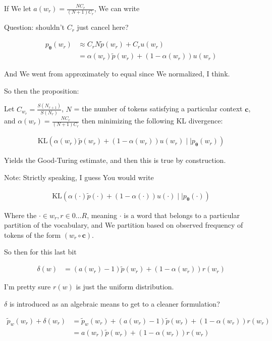 \documentclass{article}
\newcommand{\KL}{\mathrm{KL}}
\newcommand{\vtheta}{\boldsymbol{\theta}}
\newcommand{\model}{p_{\vtheta}}
\newcommand{\context}{\boldsymbol{c}}
\begin{document}
	    If We let $a(w_r) = \frac{NC_r}{(N+1)C_r}$, We can write
	    
	     Question: shouldn't $C_r$ just cancel here?
	    
	    \begin{align}
	    	\model(w_r) &\approx C_r N\tilde{p}(w_r) + C_r u(w_r)\\
	    	&= \alpha(w_r)\tilde{p}(w_r) + (1-\alpha(w_r)) u(w_r)
	    \end{align}
	    
	    And We went from approximately to equal since We normalized, I think.
	    
	    So then the proposition:
	    
	    Let $C_{w_r} = \frac{S(N_{r+1})}{S(N_r)}$, $N$ = the number of tokens satisfying a particular context $\context$, and $\alpha(w_r) = \frac{NC_r}{(N+1)C_r}$ then minimizing the following KL divergence:
	    
	    \begin{align}
	    	\KL(\alpha(w_r)\tilde{p}(w_r) + (1-\alpha(w_r))u(w_r)\mid\mid \model(w_r))
	    \end{align}
	    
	    Yields the Good-Turing estimate, and then this is true by construction.
	    
	    Note: Strictly speaking, I guess You would write
	    
	    \begin{align}
	    	\KL(\alpha(\cdot)\tilde{p}(\cdot) + (1-\alpha(\cdot))u(\cdot)\mid\mid \model(\cdot))
	    \end{align}	
	    
	    Where the $\cdot\in w_r, r\in{0\ldots R}$, meaning $\cdot$ is a word that belongs to a particular partition of the vocabulary, and We partition based on observed frequency of tokens of the form $(w_r\circ\context)$.
	    
	    So then for this last bit
	    
	    \begin{align}
	    	\delta(w) &= (a(w_r) - 1)\tilde{p}(w_r) + (1-\alpha(w_r)) r(w_r)
	    \end{align}
	    
	    I'm pretty sure $r(w)$ is just the uniform distribution. 
	    
	    $\delta$ is introduced as an algebraic means to get to a cleaner formulation?
	    
	    \begin{align}
	    	\tilde{p}_w (w_r) + \delta(w_r) &= \tilde{p}_w (w_r) + (a(w_r) - 1)\tilde{p}(w_r) + (1-\alpha(w_r)) r(w_r)\\
	    	&= a(w_r)\tilde{p}(w_r) + (1-\alpha(w_r)) r(w_r)
	    \end{align}
	    
\end{document}
